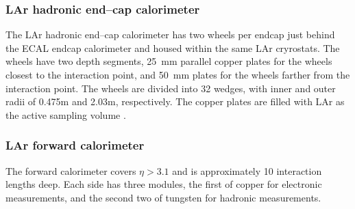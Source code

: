 \subsubsection{LAr hadronic end--cap calorimeter}
The LAr hadronic end--cap calorimeter has two wheels per endcap just behind the ECAL endcap calorimeter and housed within the same LAr cryrostats.
The wheels have two depth segments, 25~mm parallel copper plates for the wheels closest to the interaction point, and 50~mm plates for the wheels farther from the interaction point.  The wheels are divided into 32 wedges, with inner and outer radii of 0.475m and 2.03m, respectively.  The copper plates are filled with LAr as the active sampling volume \cite{ATLAS_long}.

\subsubsection{LAr forward calorimeter}
The forward calorimeter covers $\eta >3.1$ and is approximately 10 interaction lengths deep.
Each side has three modules, the first of copper  for electronic measurements, and the second two of tungsten for hadronic measurements.

